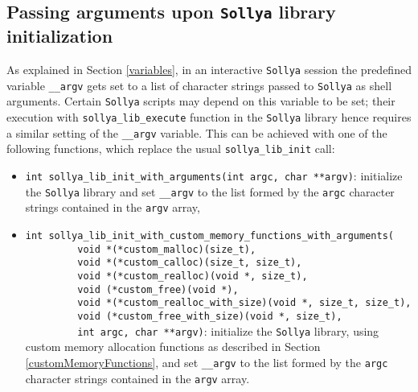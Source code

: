 \documentclass[a4paper]{article}
\newcommand{\sollya}{\texttt{Sollya}\xspace}
\begin{document}
\subsection{Passing arguments upon \sollya library initialization}
\label{libInitArgs}

As explained in Section \ref{variables}, in an interactive \sollya
session the predefined variable \verb|__argv| gets set to a list of
character strings passed to \sollya as shell arguments. Certain
\sollya scripts may depend on this variable to be set; their execution
with \verb|sollya_lib_execute| function in the \sollya library hence
requires a similar setting of the \verb|__argv| variable. This can be
achieved with one of the following functions, which replace the usual
\verb|sollya_lib_init| call:
\begin{itemize}
\item
  \verb|int sollya_lib_init_with_arguments(int argc, char **argv)|:
  initialize the \sollya library and set \verb|__argv| to the list
  formed by the \verb|argc| character strings contained in the
  \verb|argv| array,
\item \verb|int sollya_lib_init_with_custom_memory_functions_with_arguments(                   |\\
\verb|         void *(*custom_malloc)(size_t),                            |\\
\verb|         void *(*custom_calloc)(size_t, size_t),                    |\\
\verb|         void *(*custom_realloc)(void *, size_t),                   |\\
\verb|         void (*custom_free)(void *),                               |\\
\verb|         void *(*custom_realloc_with_size)(void *, size_t, size_t), |\\
\verb|         void (*custom_free_with_size)(void *, size_t),             |\\
\verb|         int argc, char **argv)|: 
initialize the \sollya library, using custom memory allocation
functions as described in Section \ref{customMemoryFunctions}, and
set \verb|__argv| to the list formed by the \verb|argc| character
strings contained in the \verb|argv| array.
\end{itemize}
\end{document}
